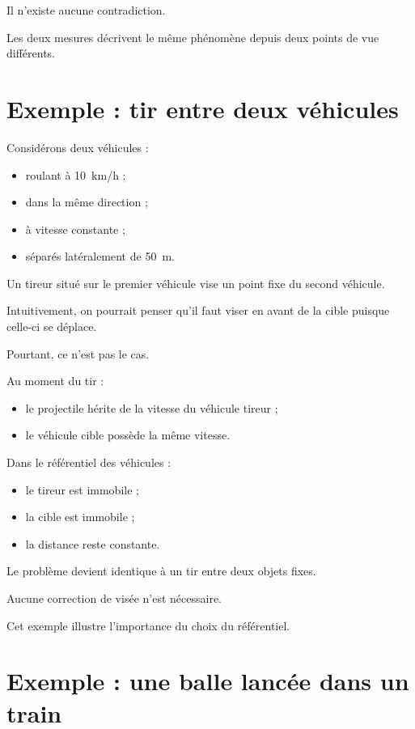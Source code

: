 Il n'existe aucune contradiction.

Les deux mesures décrivent le même phénomène depuis deux points de vue
différents.

\section{Exemple : tir entre deux véhicules}

Considérons deux véhicules :

\begin{itemize}
    \item roulant à 10~km/h ;
    \item dans la même direction ;
    \item à vitesse constante ;
    \item séparés latéralement de 50~m.
\end{itemize}

Un tireur situé sur le premier véhicule vise un point fixe du second véhicule.

Intuitivement, on pourrait penser qu'il faut viser en avant de la cible puisque
celle-ci se déplace.

Pourtant, ce n'est pas le cas.

Au moment du tir :

\begin{itemize}
    \item le projectile hérite de la vitesse du véhicule tireur ;
    \item le véhicule cible possède la même vitesse.
\end{itemize}

Dans le référentiel des véhicules :

\begin{itemize}
    \item le tireur est immobile ;
    \item la cible est immobile ;
    \item la distance reste constante.
\end{itemize}

Le problème devient identique à un tir entre deux objets fixes.

Aucune correction de visée n'est nécessaire.

Cet exemple illustre l'importance du choix du référentiel.

\section{Exemple : une balle lancée dans un train}

